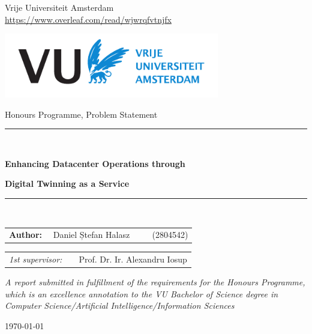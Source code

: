 \thispagestyle{empty}
\begin{center}

    Vrije Universiteit Amsterdam
    \\
    \url{https://www.overleaf.com/read/wjwrqfvtnjfx}
    \vspace{1mm}

    \includegraphics[height=28mm]{style/vu-griffioen-white.pdf}

    \vspace{1.5cm}
    {\Large Honours Programme, Problem Statement}
    \vspace*{1.5cm}

    \rule{.9\linewidth}{.6pt}\\[0.4cm]
    {\huge \bfseries Enhancing Datacenter Operations through\par}
    {\huge \bfseries Digital Twinning as a Service\par}\vspace{0.4cm}
    \rule{.9\linewidth}{.6pt}\\[1.5cm]

    \vspace*{2mm}

    {\Large
        \begin{tabular}{l}
        {\bf Author:}
            ~~Daniel Ștefan Halasz ~~~~ (2804542)
        \end{tabular}
    }

    \vspace*{1.5cm}

    \begin{tabular}{ll}
    {\it 1st supervisor:}
        & ~~Prof. Dr. Ir. Alexandru Iosup \\
    \end{tabular}

    \vspace*{2cm}

    \textit{A report submitted in fulfillment of the requirements for the Honours Programme, \\ which is an excellence annotation to the VU Bachelor of Science degree in\\ Computer Science/Artificial Intelligence/Information Sciences}

    \vspace*{1cm}

    \today\\[4cm] %

\end{center}
